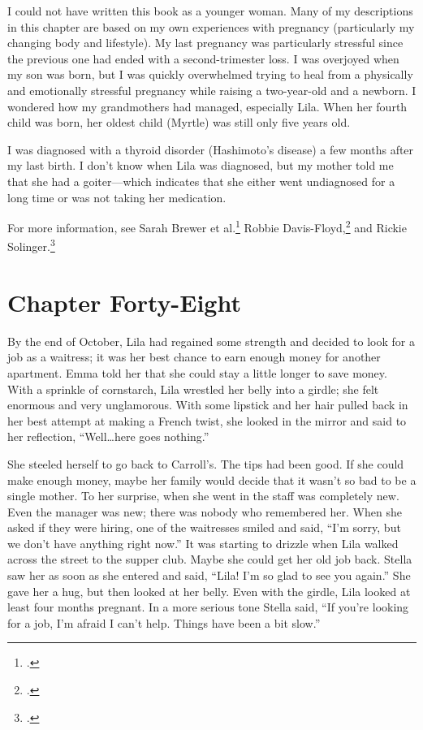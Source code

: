 \documentclass[
  american,
  letterpaper,
]{book}
\begin{document}
I could not have written this book as a younger woman. Many of my
descriptions in this chapter are based on my own experiences with
pregnancy (particularly my changing body and lifestyle). My last
pregnancy was particularly stressful since the previous one had ended
with a second-trimester loss. I was overjoyed when my son was born, but
I was quickly overwhelmed trying to heal from a physically and
emotionally stressful pregnancy while raising a two-year-old and a
newborn. I wondered how my grandmothers had managed, especially Lila.
When her fourth child was born, her oldest child (Myrtle) was still only
five years old.

I was diagnosed with a thyroid disorder (Hashimoto's disease) a few
months after my last birth. I don't know when Lila was diagnosed, but my
mother told me that she had a goiter---which indicates that she either
went undiagnosed for a long time or was not taking her medication.

For more information, see Sarah Brewer et al.\footnote{.} Robbie
Davis-Floyd,\footnote{.} and Rickie Solinger.\footnote{.}


\chapter{Chapter Forty-Eight}\label{chapter-forty-eight}

By the end of October, Lila had regained some strength and decided to
look for a job as a waitress; it was her best chance to earn enough
money for another apartment. Emma told her that she could stay a little
longer to save money. With a sprinkle of cornstarch, Lila wrestled her
belly into a girdle; she felt enormous and very unglamorous. With some
lipstick and her hair pulled back in her best attempt at making a French
twist, she looked in the mirror and said to her reflection,
``Well\ldots here goes nothing.''

She steeled herself to go back to Carroll's. The tips had been good. If
she could make enough money, maybe her family would decide that it
wasn't so bad to be a single mother. To her surprise, when she went in
the staff was completely new. Even the manager was new; there was nobody
who remembered her. When she asked if they were hiring, one of the
waitresses smiled and said, ``I'm sorry, but we don't have anything
right now.'' It was starting to drizzle when Lila walked across the
street to the supper club. Maybe she could get her old job back. Stella
saw her as soon as she entered and said, ``Lila! I'm so glad to see you
again.'' She gave her a hug, but then looked at her belly. Even with the
girdle, Lila looked at least four months pregnant. In a more serious
tone Stella said, ``If you're looking for a job, I'm afraid I can't
help. Things have been a bit slow.''
\end{document}
